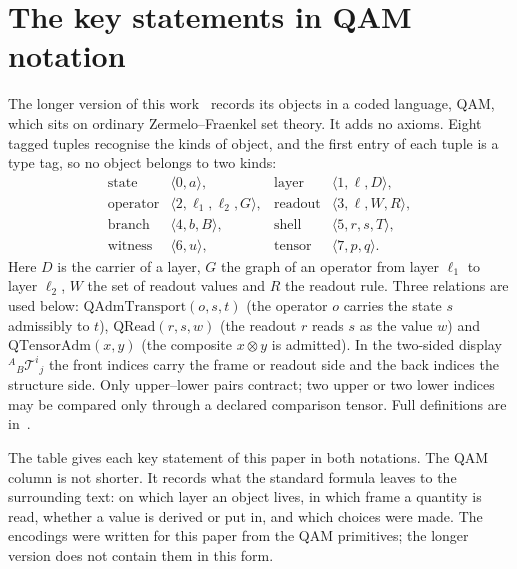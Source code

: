 \section{The key statements in QAM notation}
\label{app:qam}

The longer version of this work~\cite{companion} records its objects in a coded language, QAM, which sits on ordinary Zermelo--Fraenkel set
theory.  It adds no axioms.  Eight tagged tuples recognise the kinds of object, and the first entry of each tuple is a type tag,
so no object belongs to two kinds:
\[
\begin{array}{llll}
\text{state} & \langle 0,a\rangle, &
\text{layer} & \langle 1,\ell,D\rangle,\\
\text{operator} & \langle 2,\ell_1,\ell_2,G\rangle, &
\text{readout} & \langle 3,\ell,W,R\rangle,\\
\text{branch} & \langle 4,b,B\rangle, &
\text{shell} & \langle 5,r,s,T\rangle,\\
\text{witness} & \langle 6,u\rangle, &
\text{tensor} & \langle 7,p,q\rangle .
\end{array}
\]
Here \(D\) is the carrier of a layer, \(G\) the graph of an operator from layer \(\ell_1\) to layer \(\ell_2\), \(W\) the set of
readout values and \(R\) the readout rule.  Three relations are used below: \(\mathrm{QAdmTransport}(o,s,t)\) (the operator
\(o\) carries the state \(s\) admissibly to \(t\)), \(\mathrm{QRead}(r,s,w)\) (the readout \(r\) reads \(s\) as the value
\(w\)) and \(\mathrm{QTensorAdm}(x,y)\) (the composite \(x\otimes y\) is admitted).  In the two-sided display
\({}^{A}{}_{B}\mathcal T^{i}{}_{j}\) the front indices carry the frame or readout side and the back indices the structure
side.  Only upper--lower pairs contract; two upper or two lower indices may be compared only through a declared comparison
tensor.  Full definitions are in~\cite{companion}.

The table gives each key statement of this paper in both notations.  The QAM column is not shorter.  It records what the
standard formula leaves to the surrounding text: on which layer an object lives, in which frame a quantity is read, whether a
value is derived or put in, and which choices were made.  The encodings were written for this paper from the QAM primitives;
the longer version does not contain them in this form.

